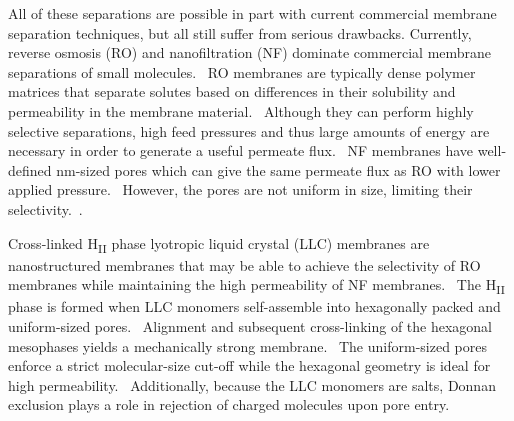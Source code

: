 \documentclass[journal=jpcbfk,manuscript=article]{achemso}
\begin{document}
  All of these separations are possible in part with current commercial
  membrane separation techniques, but
  all still
  suffer from serious drawbacks. Currently,
  reverse osmosis (RO) and nanofiltration (NF) dominate commercial membrane
  separations of small molecules.~\cite{warsinger_review_2018} RO membranes are
  typically dense polymer matrices that separate solutes based on differences in
  their solubility and permeability in the membrane
  material.~\cite{fritzmann_state---art_2007} Although they can perform highly
  selective separations, high feed pressures and thus large amounts of energy
  are necessary in order to generate a useful permeate
  flux.~\cite{van_der_bruggen_review_2003} NF membranes have well-defined
  nm-sized pores which can give the same permeate flux as RO with lower applied
  pressure.~\cite{hilal_comprehensive_2004} However, the pores are not uniform in
  size, limiting their selectivity.~\cite{werber_materials_2016}.
  

  Cross-linked H\textsubscript{II} phase lyotropic liquid crystal (LLC) 
  membranes are nanostructured membranes that may be able to achieve the
  selectivity of RO membranes while maintaining the high permeability
  of NF membranes.~\cite{zhou_supported_2005} The H\textsubscript{II}
  phase is formed when LLC monomers self-assemble into hexagonally packed
  and uniform-sized pores.~\cite{smith_ordered_1997} Alignment and subsequent
  cross-linking of the hexagonal mesophases yields a mechanically strong
  membrane.~\cite{feng_scalable_2014,feng_thin_2016} The uniform-sized pores
  enforce a strict molecular-size cut-off while the hexagonal geometry is 
  ideal for high permeability.~\cite{zhou_supported_2005} Additionally, 
  because the LLC monomers are salts, Donnan exclusion plays a role in 
  rejection of charged molecules upon pore entry.~\cite{donnan_theory_1995}
  
\end{document}

